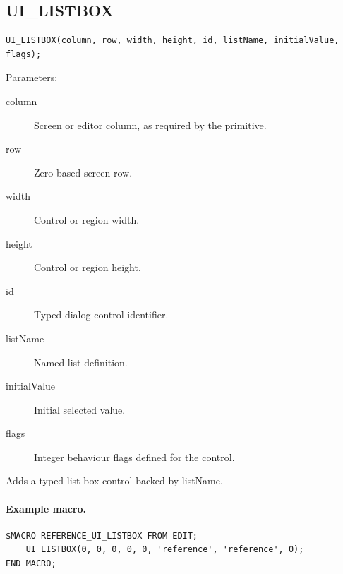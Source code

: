 \documentclass[a4paper,10pt,twoside,openany]{book}
\newenvironment{mrmacextension}{\begin{changebar}}{\end{changebar}}
\begin{document}
\begin{mrmacextension}
\label{prim:procedure-ui-listbox}
\subsection*{UI\_LISTBOX}
\begin{verbatim}
UI_LISTBOX(column, row, width, height, id, listName, initialValue, flags);
\end{verbatim}
Parameters:
\begin{description}
\item[column] Screen or editor column, as required by the primitive.
\item[row] Zero-based screen row.
\item[width] Control or region width.
\item[height] Control or region height.
\item[id] Typed-dialog control identifier.
\item[listName] Named list definition.
\item[initialValue] Initial selected value.
\item[flags] Integer behaviour flags defined for the control.
\end{description}

Adds a typed list-box control backed by listName.

\paragraph{Example macro.}
\begin{verbatim}
$MACRO REFERENCE_UI_LISTBOX FROM EDIT;
    UI_LISTBOX(0, 0, 0, 0, 0, 'reference', 'reference', 0);
END_MACRO;
\end{verbatim}
\end{mrmacextension}
\end{document}
